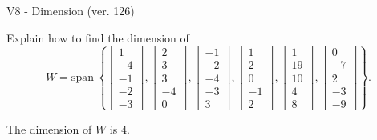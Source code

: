 \begin{exercise}
  \begin{exerciseTitle}V8 - Dimension (ver. 126)\end{exerciseTitle}
  \begin{exerciseStatement}
    Explain how to find the dimension of 
\[W=\mathrm{span}\ \left\{\left[\begin{array}{r}
1 \\
-4 \\
-1 \\
-2 \\
-3
\end{array}\right] , \left[\begin{array}{r}
2 \\
3 \\
3 \\
-4 \\
0
\end{array}\right] , \left[\begin{array}{r}
-1 \\
-2 \\
-4 \\
-3 \\
3
\end{array}\right] , \left[\begin{array}{r}
1 \\
2 \\
0 \\
-1 \\
2
\end{array}\right] , \left[\begin{array}{r}
1 \\
19 \\
10 \\
4 \\
8
\end{array}\right] , \left[\begin{array}{r}
0 \\
-7 \\
2 \\
-3 \\
-9
\end{array}\right]\right\}.\]



  \end{exerciseStatement}
  \begin{exerciseAnswer}
   The dimension of \(W\) is  \(4\).
  


  \end{exerciseAnswer}
\end{exercise}